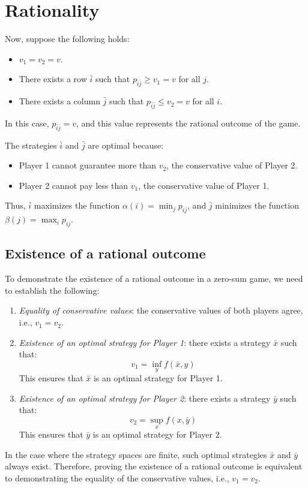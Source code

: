 \section{Rationality}

Now, suppose the following holds:
\begin{itemize}
    \item $v_1 = v_2 = v$.
    \item There exists a row $\bar{i}$ such that $p_{\bar{i}\bar{j}} \geq v_1 = v$ for all $j$.
    \item There exists a column $\bar{j}$ such that $p_{\bar{i}\bar{j}} \leq v_2 = v$ for all $i$.
\end{itemize}
In this case, $p_{\bar{i}\bar{j}} = v$, and this value represents the rational outcome of the game.

The strategies $\bar{i}$ and $\bar{j}$ are optimal because: 
\begin{itemize} 
    \item Player 1 cannot guarantee more than $v_2$, the conservative value of Player 2. 
    \item Player 2 cannot pay less than $v_1$, the conservative value of Player 1. 
\end{itemize}
Thus, $\bar{i}$ maximizes the function $\alpha(i) = \min_j p_{ij}$, and $\bar{j}$ minimizes the function $\beta(j) = \max_i p_{ij}$.

\subsection{Existence of a rational outcome}
To demonstrate the existence of a rational outcome in a zero-sum game, we need to establish the following:
\begin{enumerate}
    \item \textit{Equality of conservative values}: the conservative values of both players agree, i.e., $v_1 = v_2$.
    \item \textit{Existence of an optimal strategy for Player 1}: there exists a strategy $\bar{x}$ such that:
        \[v_1 = \inf_y f (\bar{x}, y)\]
        This ensures that $\bar{x}$ is an optimal strategy for Player 1. 
    \item \textit{Existence of an optimal strategy for Player 2}: there exists a strategy $\bar{y}$ such that:
        \[v_2 = \sup_x f (x, \bar{y})\]
        This ensures that $\bar{y}$ is an optimal strategy for Player 2.
\end{enumerate}
In the case where the strategy spaces are finite, such optimal strategies $\bar{x}$ and $\bar{y}$ always exist. 
Therefore, proving the existence of a rational outcome is equivalent to demonstrating the equality of the conservative values, i.e., $v_1 = v_2$.

